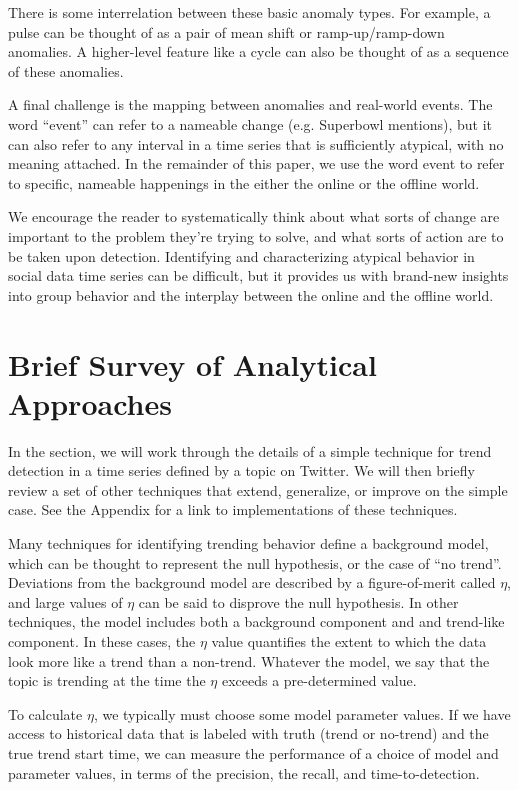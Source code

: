\documentclass{article}
\begin{document}
There is some interrelation between these basic anomaly types. For example, a
pulse can be thought of as a pair of mean shift or ramp-up/ramp-down anomalies.
A higher-level feature like a cycle can also be thought of as a sequence of
these anomalies. 
    
A final challenge is the mapping between anomalies and real-world events. The
word ``event'' can refer to a nameable change (e.g. Superbowl mentions), but it can
also refer to any interval in a time series that is sufficiently atypical, with
no meaning attached. In the remainder of this paper, we use the word event to
refer to specific, nameable happenings in the either the online or the offline world. 

We encourage the reader to systematically think about what sorts of change
are important to the problem they're trying to solve, and what sorts of
action are to be taken upon detection. Identifying and characterizing
atypical behavior in social data time series can be difficult, but it
provides us with brand-new insights into group behavior and the interplay
between the online and the offline world.  


\section{Brief Survey of Analytical Approaches}
\label{techniques}

In the section, we will work through the details of a simple technique for
trend detection in a time series defined by a topic on Twitter. We will then briefly
review a set of other techniques that extend, generalize, or improve on the
simple case. See the Appendix for a link to implementations of these
techniques.

Many techniques for identifying trending behavior define a background model,
which can be thought to represent the null hypothesis, or the case of “no
trend”. Deviations from the background model are described by a figure-of-merit
called $\eta$,
and large values of $\eta$ can be said to disprove the null hypothesis. 
In other techniques, the model includes both a background component and
and trend-like component. In these cases, the $\eta$ value quantifies the 
extent to which the data look more like a trend than a non-trend. 
Whatever the model, we say that the topic is trending at the time the
$\eta$ exceeds a pre-determined value. 

To calculate $\eta$, we typically must choose some model parameter values. 
If we have access to historical data that is labeled with truth 
(trend or no-trend) and the true trend start time, we
can measure the performance of a choice of model and parameter values, in terms
of the precision, the recall, and time-to-detection. 
\end{document}

